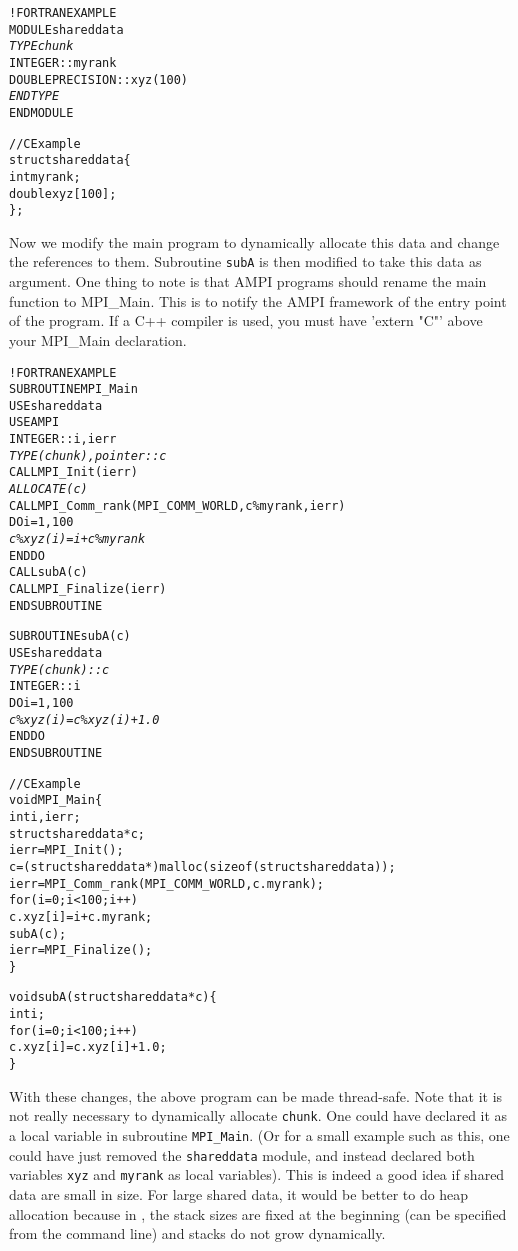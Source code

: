 \documentclass[10pt]{article}
\begin{document}
\begin{alltt}
!FORTRAN EXAMPLE
MODULE shareddata
  \emph{TYPE chunk}
    INTEGER :: myrank
    DOUBLE PRECISION :: xyz(100)
  \emph{END TYPE}
END MODULE

//C Example
struct shareddata\{
  int myrank;
  double xyz[100];
\};
\end{alltt}

Now we modify the main program to dynamically allocate this data and change the
references to them. Subroutine \texttt{subA} is then modified to take this data
as argument. One thing to note is that AMPI programs should rename the main function
to MPI\_Main. This is to notify the AMPI framework of the entry point of the program.
If a C++ compiler is used, you must have 'extern "C"' above your MPI\_Main declaration. 

\begin{alltt}
!FORTRAN EXAMPLE
SUBROUTINE MPI_Main
  USE shareddata
  USE AMPI
  INTEGER :: i, ierr
  \emph{TYPE(chunk), pointer :: c}
  CALL MPI_Init(ierr)
  \emph{ALLOCATE(c)}
  CALL MPI_Comm_rank(MPI_COMM_WORLD, c\%myrank, ierr)
  DO i = 1, 100
    \emph{c\%xyz(i) =  i + c\%myrank}
  END DO
  CALL subA(c)
  CALL MPI_Finalize(ierr)
END SUBROUTINE

SUBROUTINE subA(c)
  USE shareddata
  \emph{TYPE(chunk) :: c}
  INTEGER :: i
  DO i = 1, 100
    \emph{c\%xyz(i) = c\%xyz(i) + 1.0}
  END DO
END SUBROUTINE

//C Example
void MPI_Main\{
  int i,ierr;
  struct shareddata *c;
  ierr = MPI_Init();
  c = (struct shareddata*)malloc(sizeof(struct shareddata));
  ierr = MPI_Comm_rank(MPI_COMM_WORLD, c.myrank);
  for(i=0;i<100;i++)
    c.xyz[i] = i + c.myrank;
  subA(c);
  ierr = MPI_Finalize();
\}

void subA(struct shareddata *c)\{
  int i;
  for(i=0;i<100;i++)
    c.xyz[i] = c.xyz[i] + 1.0;
\}
\end{alltt}

With these changes, the above program can be made thread-safe. Note that it is
not really necessary to dynamically allocate \texttt{chunk}. One could have
declared it as a local variable in subroutine \texttt{MPI\_Main}.  (Or for a
small example such as this, one could have just removed the \texttt{shareddata}
module, and instead declared both variables \texttt{xyz} and \texttt{myrank} as
local variables). This is indeed a good idea if shared data are small in size.
For large shared data, it would be better to do heap allocation because in
\ampi{}, the stack sizes are fixed at the beginning (can be specified from the
command line) and stacks do not grow dynamically.
\end{document}
